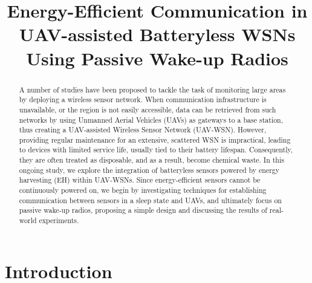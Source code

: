 \documentclass[conference]{IEEEtran}
\begin{document}
\title{Energy-Efficient Communication in UAV-assisted Batteryless WSNs Using Passive Wake-up Radios}

\author{
  \and
}

\maketitle

\begin{abstract}
  A number of studies have been proposed to tackle the task of monitoring large areas by deploying a wireless sensor network. When communication infrastructure is unavailable, or the region is not easily accessible, data can be retrieved from such networks by using Unmanned Aerial Vehicles (UAVs) as gateways to a base station, thus creating a UAV-assisted Wireless Sensor Network (UAV-WSN). However, providing regular maintenance for an extensive, scattered WSN is impractical, leading to devices with limited service life, usually tied to their battery lifespan. Consequently, they are often treated as disposable, and as a result, become chemical waste. In this ongoing study, we explore the integration of batteryless sensors powered by energy harvesting (EH) within UAV-WSNs. Since energy-efficient sensors cannot be continuously powered on, we begin by investigating techniques for establishing communication between sensors in a sleep state and UAVs, and ultimately focus on passive wake-up radios, proposing a simple design and discussing the results of real-world experiments.
\end{abstract}

\section{Introduction}
\end{document}

